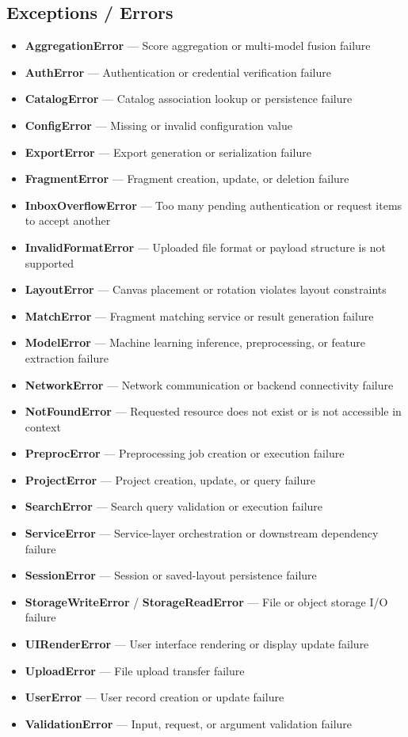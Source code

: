 \documentclass[12pt, titlepage]{article}
\begin{document}
\subsection*{Exceptions / Errors}
\begin{itemize}
    \item \textbf{AggregationError} — Score aggregation or multi-model fusion failure
    \item \textbf{AuthError} — Authentication or credential verification failure
    \item \textbf{CatalogError} — Catalog association lookup or persistence failure
    \item \textbf{ConfigError} — Missing or invalid configuration value
    \item \textbf{ExportError} — Export generation or serialization failure
    \item \textbf{FragmentError} — Fragment creation, update, or deletion failure
    \item \textbf{InboxOverflowError} — Too many pending authentication or request items to accept another
    \item \textbf{InvalidFormatError} — Uploaded file format or payload structure is not supported
    \item \textbf{LayoutError} — Canvas placement or rotation violates layout constraints
    \item \textbf{MatchError} — Fragment matching service or result generation failure
    \item \textbf{ModelError} — Machine learning inference, preprocessing, or feature extraction failure
    \item \textbf{NetworkError} — Network communication or backend connectivity failure
    \item \textbf{NotFoundError} — Requested resource does not exist or is not accessible in context
    \item \textbf{PreprocError} — Preprocessing job creation or execution failure
    \item \textbf{ProjectError} — Project creation, update, or query failure
    \item \textbf{SearchError} — Search query validation or execution failure
    \item \textbf{ServiceError} — Service-layer orchestration or downstream dependency failure
    \item \textbf{SessionError} — Session or saved-layout persistence failure
    \item \textbf{StorageWriteError} / \textbf{StorageReadError} — File or object storage I/O failure
    \item \textbf{UIRenderError} — User interface rendering or display update failure
    \item \textbf{UploadError} — File upload transfer failure
    \item \textbf{UserError} — User record creation or update failure
    \item \textbf{ValidationError} — Input, request, or argument validation failure
\end{itemize}
\end{document}
